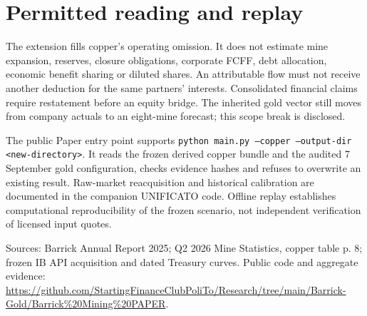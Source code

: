\documentclass[10pt,a4paper]{article}
\begin{document}
\section{Permitted reading and replay}
The extension fills copper's operating omission. It does not estimate mine expansion, reserves, closure obligations, corporate FCFF, debt allocation, economic benefit sharing or diluted shares. An attributable flow must not receive another deduction for the same partners' interests. Consolidated financial claims require restatement before an equity bridge. The inherited gold vector still moves from company actuals to an eight-mine forecast; this scope break is disclosed.

The public Paper entry point supports \texttt{python main.py --copper --output-dir <new-directory>}. It reads the frozen derived copper bundle and the audited 7 September gold configuration, checks evidence hashes and refuses to overwrite an existing result. Raw-market reacquisition and historical calibration are documented in the companion UNIFICATO code. Offline replay establishes computational reproducibility of the frozen scenario, not independent verification of licensed input quotes.

\noindent Sources: Barrick Annual Report 2025; Q2 2026 Mine Statistics, copper table p. 8; frozen IB API acquisition and dated Treasury curves. Public code and aggregate evidence: \url{https://github.com/StartingFinanceClubPoliTo/Research/tree/main/Barrick-Gold/Barrick%20Mining%20PAPER}.
\end{document}
